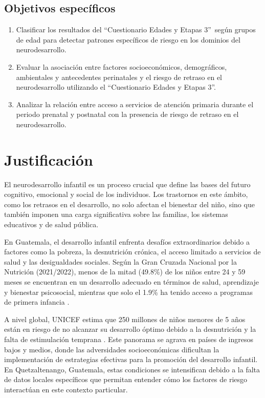\documentclass[11pt,letterpaper]{report}
\newcommand{\asq}{“Cuestionario Edades y Etapas 3”}
\begin{document}
\section{Objetivos específicos}
	\begin{enumerate}
		\item Clasificar los resultados del \asq\ según grupos de edad para
		detectar patrones específicos de riesgo en los dominios del
		neurodesarrollo.
		
		\item Evaluar la asociación entre factores socioeconómicos,
		demográficos, ambientales y antecedentes perinatales y el riesgo de
		retraso en el neurodesarrollo utilizando el \asq.
		
		\item Analizar la relación entre acceso a servicios de atención
		primaria durante el periodo prenatal y postnatal con la presencia de
		riesgo de retraso en el neurodesarrollo.
	\end{enumerate}

	\chapter{Justificación}
El neurodesarrollo infantil es un proceso crucial que define las bases del 
futuro cognitivo, emocional y social de los individuos. Los trastornos en este
ámbito, como los retrasos en el desarrollo, no solo afectan el bienestar del
niño, sino que también imponen una carga significativa sobre las familias, los
sistemas educativos y de salud pública.

En Guatemala, el desarrollo infantil enfrenta desafíos extraordinarios debido a
factores como la pobreza, la desnutrición crónica, el acceso limitado a
servicios de salud y las desigualdades sociales. Según la Gran Cruzada Nacional
por la Nutrición (2021/2022), menos de la mitad (49.8\%) de los niños entre 24
y 59 meses se encuentran en un desarrollo adecuado en términos de salud,
aprendizaje y bienestar psicosocial, mientras que solo el 1.9\% ha tenido
acceso a programas de primera infancia \cite{SESAN2022}.

A nivel global, UNICEF estima que 250 millones de niños menores de 5 años están
en riesgo de no alcanzar su desarrollo óptimo debido a la desnutrición y la
falta de estimulación temprana \cite{UNICEF2023}. Este panorama se agrava en
países de ingresos bajos y medios, donde las adversidades socioeconómicas
dificultan la implementación de estrategias efectivas para la promoción del
desarrollo infantil. En Quetzaltenango, Guatemala, estas condiciones se
intensifican debido a la falta de datos locales específicos que permitan
entender cómo los factores de riesgo interactúan en este contexto particular.
\end{document}
